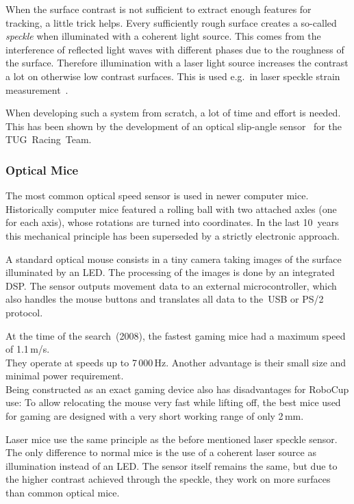 \documentclass[12pt,a4paper]{article}
\begin{document}
When the surface contrast is not sufficient to extract enough features for tracking, a little trick helps.
Every sufficiently rough surface creates a so-called \emph{speckle} when illuminated with a coherent light source.
This comes from the interference of reflected light waves with different phases due to the roughness of the surface.
Therefore illumination with a laser light source increases the contrast a lot on otherwise low contrast surfaces.
This is used e.g.\ in laser speckle strain measurement~\cite{strain}.

When developing such a system from scratch, a lot of time and effort is needed.
This has been shown by the development of an optical slip-angle sensor~\cite{Hrach2006} for the TUG~Racing~Team.

\subsubsection{Optical Mice}

The most common optical speed sensor is used in newer computer mice.
Historically computer mice featured a rolling ball with two attached axles (one for each axis), whose rotations are turned into coordinates.
In the last 10~years this mechanical principle has been superseded by a strictly electronic approach.

A standard optical mouse consists in a tiny camera taking images of the surface illuminated by an LED.
The processing of the images is done by an integrated DSP.
The sensor outputs movement data to an external microcontroller, which also handles the mouse buttons and translates all data to the~USB or PS/2 protocol.

At the time of the search~(2008), the fastest gaming mice had a maximum speed of 1.1\,m/s.\\
They operate at speeds up to 7\,000\,Hz.
Another advantage is their small size and minimal power requirement.\\
Being constructed as an exact gaming device also has disadvantages for RoboCup use:
To allow relocating the mouse very fast while lifting off, the best mice used for gaming are designed with a very short working range of only 2\,mm.

Laser mice use the same principle as the before mentioned laser speckle sensor.
The only difference to normal mice is the use of a coherent laser source as illumination instead of an LED.
The sensor itself remains the same, but due to the higher contrast achieved through the speckle, they work on more surfaces than common optical mice.
\end{document}
